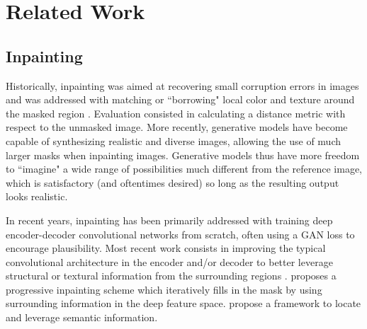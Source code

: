 \section{Related Work}






\subsection{Inpainting}

Historically, inpainting was aimed at recovering small corruption errors in images and 
was addressed with matching or ``borrowing" local color and texture around the masked
 region \cite{poisson, patch_based}. Evaluation consisted in calculating a distance
  metric with respect to the unmasked image. More recently, generative models have 
  become capable of synthesizing realistic and diverse images, allowing the use of much
   larger masks when inpainting images. Generative models thus have more freedom 
   to ``imagine" a wide range of possibilities much different from the reference image,
    which is satisfactory (and oftentimes desired) so long as the resulting output looks
     realistic. 

In recent years, inpainting has been primarily addressed with training deep 
encoder-decoder convolutional networks from scratch, often using a 
GAN\cite{goodfellowgans} loss to encourage plausibility. Most recent work consists in 
improving the typical convolutional architecture in the encoder and/or decoder to better
 leverage structural or textural information from the surrounding regions 
 \cite{lama, hong2019deep, yu2020region, hukkelaas2020image, yang2020learning, zhu2021image, liu2018image, ma2022regionwise, zheng2022cm}. 
 \cite{li2020recurrent} proposes a progressive inpainting scheme which iteratively 
 fills in the mask by using surrounding information in the deep feature space.  
 \cite{xiong2019foreground, liao2020guidance} propose a framework to locate and 
 leverage semantic information.


